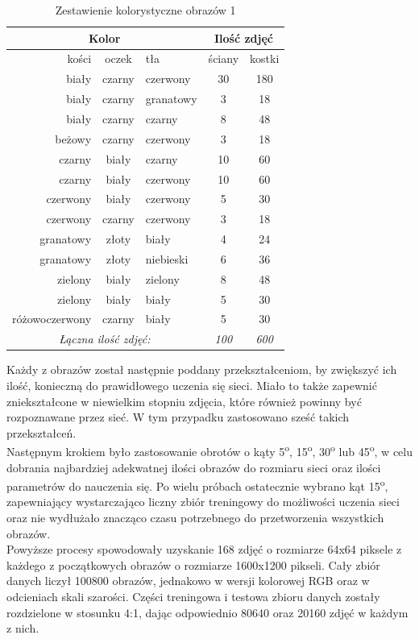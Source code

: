 \begin{table}[ht]
\centering
\begin{tabular}{rcl|cc}
\multicolumn{3}{c}{Kolor} & \multicolumn{2}{c}{Ilość zdjęć} \\ \hline
kości & oczek & tła & ściany & kostki \\ \hline
biały & czarny & czerwony & 30 & 180 \\
biały & czarny & granatowy & 3 & 18 \\
biały & czarny & czarny & 8 & 48 \\
beżowy & czarny & czerwony & 3 & 18 \\
czarny & biały & czarny & 10 & 60 \\
czarny & biały & czerwony & 10 & 60 \\
czerwony & biały & czerwony & 5 & 30 \\
czerwony & czarny & czerwony & 3 & 18 \\
granatowy & złoty & biały & 4 & 24 \\
granatowy & złoty & niebieski & 6 & 36 \\
zielony & biały & zielony & 8 & 48 \\
zielony & biały & biały & 5 & 30 \\
różowoczerwony & czarny & biały & 5 & 30 \\ \hline
\multicolumn{3}{c}{\textit{Łączna ilość zdjęć:}} & \textit{100} & \textit{600}
\end{tabular}
\vspace{0.2cm}
\caption{Zestawienie kolorystyczne obrazów 1}
\label{tab:zestawienie1}
\end{table}

Każdy z obrazów został następnie poddany przekształceniom, by zwiększyć ich ilość, konieczną
do prawidłowego uczenia się sieci. Miało to także zapewnić zniekształcone w niewielkim stopniu
zdjęcia, które również powinny być rozpoznawane przez sieć. W tym przypadku zastosowano sześć
takich przekształceń. \\
Następnym krokiem było zastosowanie obrotów o kąty 5\textsuperscript{o},
15\textsuperscript{o}, 30\textsuperscript{o} lub 45\textsuperscript{o}, w celu dobrania
najbardziej adekwatnej ilości obrazów do rozmiaru sieci oraz ilości parametrów
do nauczenia się. Po wielu próbach ostatecznie wybrano kąt 15\textsuperscript{o}, zapewniający
wystarczająco liczny zbiór treningowy do możliwości uczenia sieci oraz nie
wydłużało znacząco czasu potrzebnego do przetworzenia wszystkich obrazów.\\
Powyższe procesy spowodowały uzyskanie 168 zdjęć o rozmiarze 64x64 piksele z każdego
z początkowych obrazów o rozmiarze 1600x1200 pikseli. Cały zbiór danych liczył 100800
obrazów, jednakowo w wersji kolorowej RGB oraz w odcieniach skali szarości. Części
treningowa i testowa zbioru danych zostały rozdzielone w stosunku 4:1, dając odpowiednio
80640 oraz 20160 zdjęć w każdym z nich. \\\\


